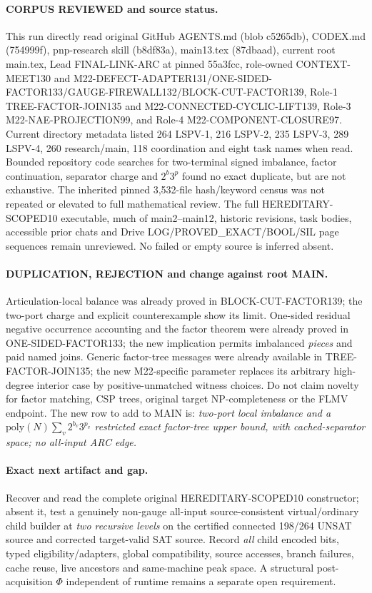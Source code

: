 \documentclass[11pt]{article}
\begin{document}
\paragraph{CORPUS REVIEWED and source status.}
This run directly read original GitHub AGENTS.md (blob c5265db), CODEX.md (754999f), pnp-research skill (b8df83a), main13.tex (87dbaad), current root main.tex, Lead FINAL-LINK-ARC at pinned 55a3fcc, role-owned CONTEXT-MEET130 and M22-DEFECT-ADAPTER131/ONE-SIDED-FACTOR133/GAUGE-FIREWALL132/BLOCK-CUT-FACTOR139, Role-1 TREE-FACTOR-JOIN135 and M22-CONNECTED-CYCLIC-LIFT139, Role-3 M22-NAE-PROJECTION99, and Role-4 M22-COMPONENT-CLOSURE97. Current directory metadata listed 264 LSPV-1, 216 LSPV-2, 235 LSPV-3, 289 LSPV-4, 260 research/main, 118 coordination and eight task names when read. Bounded repository code searches for two-terminal signed imbalance, factor continuation, separator charge and \(2^b3^p\) found no exact duplicate, but are not exhaustive. The inherited pinned 3,532-file hash/keyword census was not repeated or elevated to full mathematical review. The full HEREDITARY-SCOPED10 executable, much of main2--main12, historic revisions, task bodies, accessible prior chats and Drive LOG/PROVED\_EXACT/BOOL/SIL page sequences remain unreviewed. No failed or empty source is inferred absent.

\paragraph{DUPLICATION, REJECTION and change against root MAIN.}
Articulation-local balance was already proved in BLOCK-CUT-FACTOR139; the two-port charge and explicit counterexample show its limit. One-sided residual negative occurrence accounting and the factor theorem were already proved in ONE-SIDED-FACTOR133; the new implication permits imbalanced \emph{pieces} and paid named joins. Generic factor-tree messages were already available in TREE-FACTOR-JOIN135; the new M22-specific parameter replaces its arbitrary high-degree interior case by positive-unmatched witness choices. Do not claim novelty for factor matching, CSP trees, original target NP-completeness or the FLMV endpoint. The new row to add to MAIN is: \emph{two-port local imbalance and a \(\mathrm{poly}(N)\sum_v2^{b_v}3^{p_v}\) restricted exact factor-tree upper bound, with cached-separator space; no all-input ARC edge.}

\paragraph{Exact next artifact and gap.}
Recover and read the complete original HEREDITARY-SCOPED10 constructor; absent it, test a genuinely non-gauge all-input source-consistent virtual/ordinary child builder at \emph{two recursive levels} on the certified connected 198/264 UNSAT source and corrected target-valid SAT source. Record \emph{all} child encoded bits, typed eligibility/adapters, global compatibility, source accesses, branch failures, cache reuse, live ancestors and same-machine peak space. A structural post-acquisition \(\Phi\) independent of runtime remains a separate open requirement.
\end{document}
